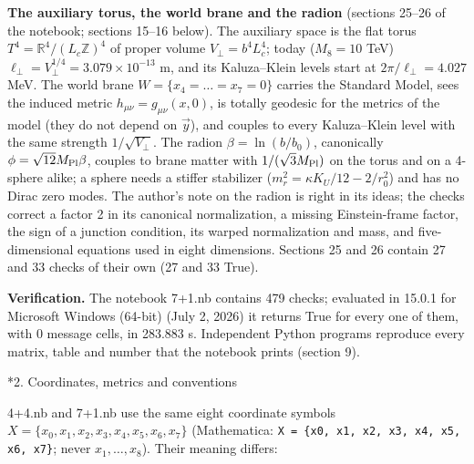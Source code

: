 \documentclass[10pt,a4paper]{article}
\makeatletter
\renewcommand\section{\@startsection{section}{1}{\z@}{-3.5ex \@plus -1ex \@minus -.2ex}{2.3ex \@plus.2ex}{\normalfont\Large\bfseries\raggedright}}
\makeatother
\begin{document}
\textbf{The auxiliary torus, the world brane and the radion} (sections 25–26 of the notebook; sections 15–16 below). The auxiliary space is the flat torus $T^4=\mathbb R^4/(L_c\mathbb Z)^4$ of proper volume $V_\perp=b^4L_c^4$; today ($M_8=10$ TeV) $\ell_\perp=V_\perp^{1/4}=3.079\times10^{-13}$ m, and its Kaluza–Klein levels start at $2\pi/\ell_\perp=4.027$ MeV. The world brane $W=\{x_4=\dots=x_7=0\}$ carries the Standard Model, sees the induced metric $h_{\mu\nu}=g_{\mu\nu}(x,0)$, is totally geodesic for the metrics of the model (they do not depend on $\vec y$), and couples to every Kaluza–Klein level with the same strength $1/\sqrt{V_\perp}$. The radion $\beta=\ln(b/b_0)$, canonically $\phi=\sqrt{12}M_{\rm Pl}\beta$, couples to brane matter with $1/(\sqrt3M_{\rm Pl})$ on the torus and on a 4-sphere alike; a sphere needs a stiffer stabilizer ($m_r^2=\kappa K_U/12-2/r_0^2$) and has no Dirac zero modes. The author’s note on the radion is right in its ideas; the checks correct a factor 2 in its canonical normalization, a missing Einstein-frame factor, the sign of a junction condition, its warped normalization and mass, and five-dimensional equations used in eight dimensions. Sections 25 and 26 contain 27 and 33 checks of their own (27 and 33 True).

\textbf{Verification.} The notebook 7+1.nb contains 479 checks; evaluated in 15.0.1 for Microsoft Windows (64-bit) (July 2, 2026) it returns True for every one of them, with 0 message cells, in 283.883 s. Independent Python programs reproduce every matrix, table and number that the notebook prints (section 9).

\section*{2. Coordinates, metrics and conventions}
4+4.nb and 7+1.nb use the same eight coordinate symbols $X=\lbrace x_0,x_1,x_2,x_3,x_4,x_5,x_6,x_7\rbrace$ (Mathematica: \texttt{X = \{x0, x1, x2, x3, x4, x5, x6, x7\}}; never $x_1,\dots,x_8$). Their meaning differs:
\end{document}
